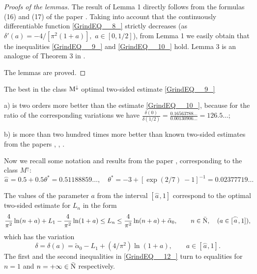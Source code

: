 \documentclass[
11pt,%
tightenlines,%
twoside,%
onecolumn,%
nofloats,%
nobibnotes,%
nofootinbib,%
superscriptaddress,%
noshowpacs,%
centertags]%
{revtex4}
\begin{document}
\begin{proof}[Proofs of the lemmas]
	The result of Lemma 1 directly follows from the formulas (16) and  (17) of the paper \cite{Sh18}. Taking into account that the continuously differentiable function \eqref{GrindEQ__8_} strictly decreases (as $\delta '(a)=-4/[\pi ^{2} (1+a)],\,\, a\in [0, 1/2]$), from Lemma 1 we easily obtain that the inequalities \eqref{GrindEQ__9_} and \eqref{GrindEQ__10_} hold. Lemma 3 is an analogue of Theorem 3 in \cite{Sh18}.

The lemmas are proved.
\end{proof}

\begin{remark} The best in the class ${\rm M} ^{\downarrow } $ optimal two-sided estimate \eqref{GrindEQ__9_}

a) is two orders more better than the estimate \eqref{GrindEQ__10_}, because for the ratio of the corresponding variations we have $\frac{\delta (0)}{\delta (1/2)} = \frac{0.16563788\dots}{0.00130906\dots} = 126.5\dots$;

b) is more than two hundred times more better than known two-sided estimates from the papers \cite{G}, \cite[p.~258]{A}, \cite[p.~183]{J}.
\end{remark}

Now we recall some notation and results from the paper \cite{Sh19}, corresponding to the class $M^{\uparrow } $:
\begin{equation}\label{GrindEQ__11_}
\stackrel{\frown}{a}=0.5 + 0.5 \theta ^{*} = 0.51188859\dots, \quad \theta ^{*}  =  -3+[\exp (2/7)\ -1]^{-1}  = 0.02377719\dots
\end{equation}


\begin{lemma} The values of the parameter $a$ from the interval $[\stackrel{\frown}{a}, 1]$ correspond to the optimal two-sided estimate for $L_{n}$ in the form
\begin{equation} \label{GrindEQ__12_}  \frac{4}{\pi ^{2} } \ln (n+ a)  +  L_{1}  -  \frac{4}{\pi ^{2} } \ln (1+a)   \le   L_{n}   \le   \frac{4}{\pi ^{2} } \ln (n+ a)  +  \tilde{\alpha }_{0}, \qquad n\in \bar{{\rm N} },\quad (a\in [\stackrel{\frown}{a}, 1]),
\end{equation}
which has the variation
\begin{equation} \label{GrindEQ__13_} \delta =\delta (a)=  \tilde{\alpha }_{0}  -  L_{1}   +  (4/\pi ^{2} )\ln (1+a) ,     \qquad  a\in    [\stackrel{\frown}{a}, 1].
\end{equation}
The first and the second inequalities in \eqref{GrindEQ__12_} turn to equalities for $ n = 1$ and $n = +\infty \in \bar{{\rm N} }$    respectively.
\end{lemma}
\end{document}
